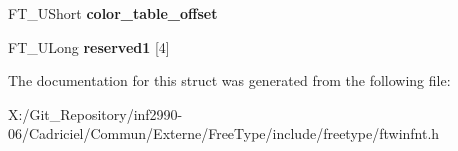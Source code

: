 \begin{DoxyCompactItemize}
\item 
\hypertarget{struct_f_t___win_f_n_t___header_rec___a83fa51bfd7fe814f8264416204701c60}{F\-T\-\_\-\-U\-Short {\bfseries color\-\_\-table\-\_\-offset}}\label{struct_f_t___win_f_n_t___header_rec___a83fa51bfd7fe814f8264416204701c60}

\item 
\hypertarget{struct_f_t___win_f_n_t___header_rec___af01de9742608fb7a2a603d062f3783e3}{F\-T\-\_\-\-U\-Long {\bfseries reserved1} \mbox{[}4\mbox{]}}\label{struct_f_t___win_f_n_t___header_rec___af01de9742608fb7a2a603d062f3783e3}

\end{DoxyCompactItemize}


The documentation for this struct was generated from the following file\-:\begin{DoxyCompactItemize}
\item 
X\-:/\-Git\-\_\-\-Repository/inf2990-\/06/\-Cadriciel/\-Commun/\-Externe/\-Free\-Type/include/freetype/ftwinfnt.\-h\end{DoxyCompactItemize}
